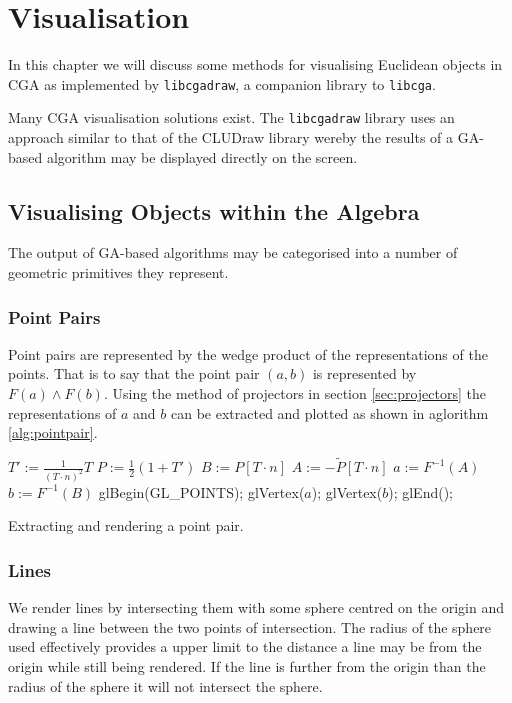 \chapter{Visualisation}

In this chapter we will discuss some methods for visualising Euclidean objects
in CGA as implemented by {\tt libcgadraw}, a companion library to {\tt libcga}.

Many CGA visualisation solutions exist\cite{CLU}. The {\tt libcgadraw} library
uses an approach similar to that of the CLUDraw library wereby the results of 
a GA-based algorithm may be displayed directly on the screen.

\section{Visualising Objects within the Algebra}

The output of GA-based algorithms may be categorised into a number of
geometric primitives they represent.

\subsection{Point Pairs}

Point pairs are represented by the wedge product of the representations of the
points. That is to say that the point pair $(a,b)$ is represented by $F(a) \wedge F(b)$.
Using the method of projectors in section \ref{sec:projectors} the representations
of $a$ and $b$ can be extracted and plotted as shown in aglorithm \ref{alg:pointpair}.

\begin{fancyalg}
\begin{algorithmic}[1]
\STATE $T' := \frac{1}{(T \cdot n)^2} T$
\STATE $P := \frac{1}{2}(1+T')$
\STATE $B := P \left[ T\cdot n \right]$
\STATE $A := - \tilde{P} \left[ T \cdot n \right]$
\STATE $a := F^{-1}(A)$
\STATE $b := F^{-1}(B)$
\STATE glBegin(GL\_POINTS);
\STATE glVertex($a$); glVertex($b$);
\STATE glEnd();
\end{algorithmic}
\caption{\label{alg:pointpair}Extracting and rendering a point pair.}
\end{fancyalg}

\subsection{Lines}

We render lines by intersecting them with some sphere centred on the origin
and drawing a line between the two points of intersection. The radius of the
sphere used effectively provides a upper limit to the distance a line may be
from the origin while still being rendered. If the line is further from the 
origin than the radius of the sphere it will not intersect the sphere.

